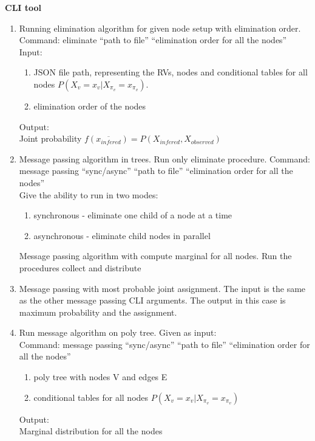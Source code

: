 \documentclass{article}
\begin{document}
    \vspace{0.1cm}
    \textbf{CLI tool}\\
    \begin{enumerate}
        \item Running elimination algorithm for given node setup with elimination order.\\
        Command: eliminate \enquote{path to file} \enquote{elimination order for all the nodes}\\
        Input:\\
        \begin{enumerate}
            \item JSON file path, representing the RVs, nodes and conditional tables for all nodes $P(X_v=x_v|X_{\pi_v}=x_{\pi_v})$.
            \item elimination order of the nodes
        \end{enumerate}
        Output:\\
        Joint probability $f(\overline{x_{infered}})=P(X_{infered},X_{observed})$\\

        

        \item Message passing algorithm in trees. Run only eliminate procedure.
        Command: message passing \enquote{sync/async} \enquote{path to file} \enquote{elimination order for all the nodes}\\
        Give the ability to run in two modes:\\
        \begin{enumerate}
            \item synchronous - eliminate one child of a node at a time
            \item asynchronous - eliminate child nodes in parallel
        \end{enumerate}
        Message passing algorithm with compute marginal for all nodes. Run the procedures collect and distribute\\

        \item Message passing with most probable joint assignment. The input is the same as the other message passing CLI arguments. The output in this case is maximum probability and the assignment.

        \item Run message algorithm on poly tree. Given as input:\\
        Command: message passing \enquote{sync/async} \enquote{path to file} \enquote{elimination order for all the nodes}\\
        \begin{enumerate}
            \item poly tree with nodes V and edges E
            \item conditional tables for all nodes $P(X_v=x_v|X_{\pi_v}=x_{\pi_v})$
        \end{enumerate}
        Output:\\
        Marginal distribution for all the nodes
    \end{enumerate}
\end{document}
